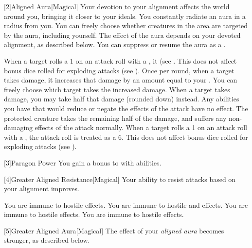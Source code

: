         [2]{Aligned Aura}[Magical]
        Your devotion to your alignment affects the world around you, bringing it closer to your ideals.
        You constantly radiate an aura in a \areamed radius  from you.
        You can freely choose whether creatures in the area are targeted by the aura, including yourself.
        The effect of the aura depends on your devoted alignment, as described below.
        You can suppress or resume the aura as a .

         When a target rolls a 1 on an attack roll with a , it  (see .
        This does not affect bonus dice rolled for exploding attacks (see ).
         Once per round, when a target takes damage, it increases that damage by an amount equal to your .
        You can freely choose which target takes the increased damage.
         When a target takes damage, you may take half that damage (rounded down) instead.
        Any abilities you have that would reduce or negate the effects of the attack have no effect.
        The protected creature takes the remaining half of the damage, and suffers any non-damaging effects of the attack normally.
         When a target rolls a 1 on an attack roll with a , the attack roll is treated as a 6.
        This does not affect bonus dice rolled for exploding attacks (see ).

        [3]{Paragon Power}
        You gain a  bonus to  with  abilities.

        [4]{Greater Aligned Resistance}[Magical]
        Your ability to resist attacks based on your alignment improves.

         You are immune to hostile  effects.
         You are immune to hostile  and  effects.
         You are immune to hostile  effects.
         You are immune to hostile  effects.

        [5]{Greater Aligned Aura}[Magical]
        The effect of your \textit{aligned aura} becomes stronger, as described below.

